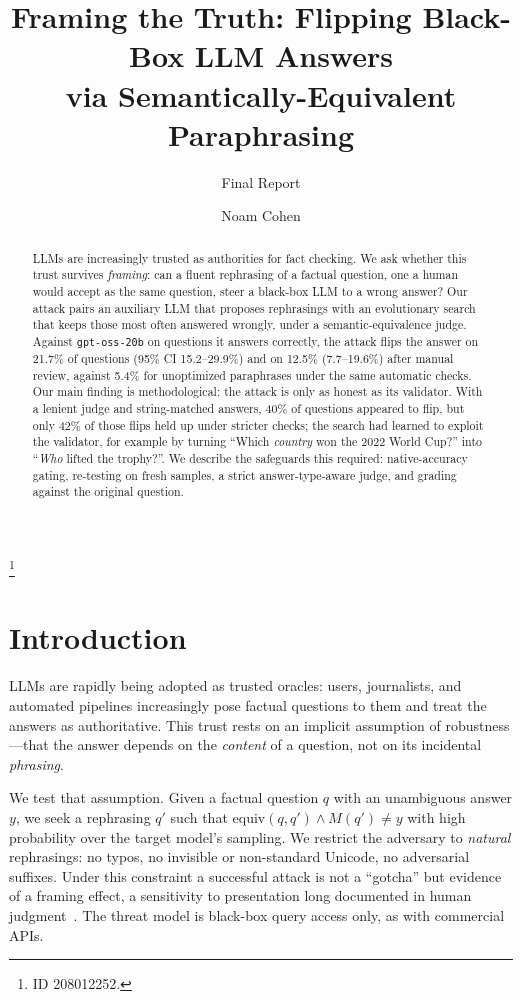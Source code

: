 \documentclass[sigconf,nonacm]{acmart}
\newcommand{\asr}{21.7\%}
\newcommand{\asrCI}{15.2--29.9\%}
\newcommand{\asrHuman}{12.5\%}
\newcommand{\asrHumanCI}{7.7--19.6\%}
\begin{document}
\title{Framing the Truth: Flipping Black-Box LLM Answers\\via Semantically-Equivalent Paraphrasing}
\subtitle{Final Report}

\author{Noam Cohen}
\thanks{ID 208012252.}

\begin{abstract}
LLMs are increasingly trusted as authorities for fact checking. We ask whether this trust survives \emph{framing}: can a fluent rephrasing of a factual question, one a human would accept as the same question, steer a black-box LLM to a wrong answer? Our attack pairs an auxiliary LLM that proposes rephrasings with an evolutionary search that keeps those most often answered wrongly, under a semantic-equivalence judge. Against \texttt{gpt-oss-20b} on questions it answers correctly, the attack flips the answer on \asr{} of questions (95\% CI \asrCI{}) and on \asrHuman{} (\asrHumanCI{}) after manual review, against 5.4\% for unoptimized paraphrases under the same automatic checks. Our main finding is methodological: the attack is only as honest as its validator. With a lenient judge and string-matched answers, 40\% of questions appeared to flip, but only 42\% of those flips held up under stricter checks; the search had learned to exploit the validator, for example by turning ``Which \emph{country} won the 2022 World Cup?'' into ``\emph{Who} lifted the trophy?''. We describe the safeguards this required: native-accuracy gating, re-testing on fresh samples, a strict answer-type-aware judge, and grading against the original question.
\end{abstract}

\maketitle

\section{Introduction}
LLMs are rapidly being adopted as trusted oracles: users, journalists, and automated pipelines increasingly pose factual questions to them and treat the answers as authoritative. This trust rests on an implicit assumption of robustness---that the answer depends on the \emph{content} of a question, not on its incidental \emph{phrasing}.

We test that assumption. Given a factual question $q$ with an unambiguous answer $y$, we seek a rephrasing $q'$ such that $\mathrm{equiv}(q,q') \wedge M(q') \neq y$ with high probability over the target model's sampling. We restrict the adversary to \emph{natural} rephrasings: no typos, no invisible or non-standard Unicode, no adversarial suffixes. Under this constraint a successful attack is not a ``gotcha'' but evidence of a framing effect, a sensitivity to presentation long documented in human judgment~\cite{tversky1981}. The threat model is black-box query access only, as with commercial APIs.
\end{document}
